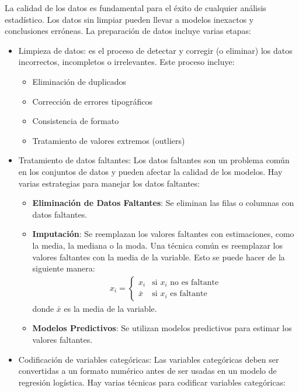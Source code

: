 \documentclass[a4paper]{report} %
\begin{document}
La calidad de los datos es fundamental para el \'exito de cualquier an\'alisis estad\'istico. Los datos sin limpiar pueden llevar a modelos inexactos y conclusiones err\'oneas. La preparaci\'on de datos incluye varias etapas:
\begin{itemize}
    \item Limpieza de datos: es el proceso de detectar y corregir (o eliminar) los datos incorrectos, incompletos o irrelevantes. Este proceso incluye:
\begin{itemize}
    \item Eliminaci\'on de duplicados
    \item Correcci\'on de errores tipogr\'aficos
    \item Consistencia de formato
    \item Tratamiento de valores extremos (outliers)
\end{itemize}

    \item Tratamiento de datos faltantes: Los datos faltantes son un problema com\'un en los conjuntos de datos y pueden afectar la calidad de los modelos. Hay varias estrategias para manejar los datos faltantes:
\begin{itemize}
    \item \textbf{Eliminaci\'on de Datos Faltantes}: Se eliminan las filas o columnas con datos faltantes.
    \item \textbf{Imputaci\'on}: Se reemplazan los valores faltantes con estimaciones, como la media, la mediana o la moda. Una t\'ecnica com\'un es reemplazar los valores faltantes con la media de la variable. Esto se puede hacer de la siguiente manera:
\begin{eqnarray*}
x_i = \begin{cases} 
      x_i & \text{si } x_i \text{ no es faltante} \\
      \bar{x} & \text{si } x_i \text{ es faltante}
   \end{cases}
\end{eqnarray*}
donde $\bar{x}$ es la media de la variable.

    \item \textbf{Modelos Predictivos}: Se utilizan modelos predictivos para estimar los valores faltantes.
\end{itemize}

    
    \item Codificaci\'on de variables categ\'oricas: Las variables categ\'oricas deben ser convertidas a un formato num\'erico antes de ser usadas en un modelo de regresi\'on log\'istica. Hay varias t\'ecnicas para codificar variables categ\'oricas:


\end{itemize}
\end{document}
